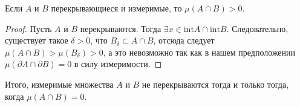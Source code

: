 \begin{Statement}
    Если $A$ и $B$ перекрывающиеся и измеримые, то $\mu(A \cap B) > 0$.
\end{Statement}
\begin{proof}
    Пусть $A$ и $B$ перекрываются. Тогда $\exists x \in \mathrm{int} A \cap \mathrm{int}B$. Следовательно, существует такое $\delta > 0$, что $B_\delta \subset A \cap B$, отсюда следует $\mu(A \cap B) > \mu(B_\delta) > 0$, а это невозможно так как в нашем предположении $\mu (\partial A \cap \partial B) = 0$ в силу измеримости. 

\end{proof}
Итого, измеримые множества $A$ и $B$ не перекрываются тогда и только тогда, когда $\mu(A \cap B) = 0.$